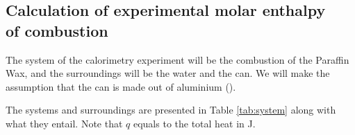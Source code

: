 \documentclass[
	letterpaper, %
	12pt, %
]{CSUniSchoolLabReport}
\begin{document}
\subsection{Calculation of experimental molar enthalpy\\ of combustion}
The system of the calorimetry experiment will be the combustion of the Paraffin Wax,
and the surroundings will be the water and the can. We will make the assumption that
the can is made out of aluminium (\cite{Drink_can_2023}).

The systems and surroundings are presented in Table \ref*{tab:system} along with
what they entail. Note that \(q\) equals to the total heat in J.

\begin{table}[H]
  \centering
  \caption{System and surroundings of the calorimeter.}
  \label{tab:system}
\end{table}
\end{document}

